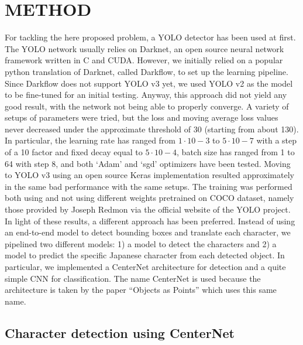 \section{METHOD}
\label{sec:method}

For tackling the here proposed problem, a YOLO detector has been used at first. The YOLO network usually relies on Darknet, an open source neural network framework written in C and CUDA. However, we initially relied on a popular python translation of Darknet, called Darkflow, to set up the learning pipeline. Since Darkflow does not support YOLO v3 yet, we used YOLO v2 as the model to be fine-tuned for an initial testing. Anyway, this approach did not yield any good result, with the network not being able to properly converge. A variety of setups of parameters were tried, but the loss and moving average loss values never decreased under the approximate threshold of 30 (starting from about 130). In particular, the learning rate has ranged from $1 \cdot 10-3$ to $5 \cdot 10-7$ with a step of a 10 factor and fixed decay equal to $5 \cdot 10-4$, batch size has ranged from 1 to 64 with step 8, and both ‘Adam’ and ‘sgd’ optimizers have been tested. Moving to YOLO v3 using an open source Keras implementation resulted approximately in the same bad performance with the same setups. The training was performed both using and not using different weights pretrained on COCO dataset, namely those provided by Joseph Redmon via the official website of the YOLO project. In light of these results, a different approach has been preferred. Instead of using an end-to-end model to detect bounding boxes and translate each character, we pipelined two different models: 1) a model to detect the characters and 2) a model to predict the specific Japanese character from each detected object. In particular, we implemented a CenterNet architecture for detection and a quite simple CNN for classification. The name CenterNet is used because the architecture is taken by the paper “Objects as Points” which uses this same name.

\subsection{Character detection using CenterNet}
\label{ssec:charactercenternet}

